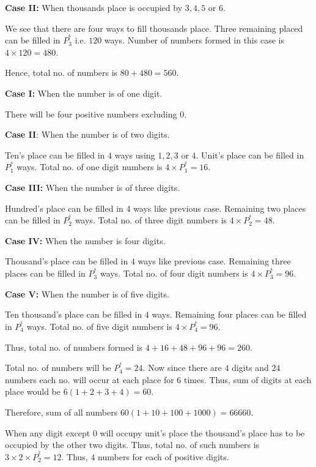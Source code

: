   {\bf Case II:} When thousands place is occupied by $3, 4, 5$ or $6$.

  We see that there are four ways to fill thousands place. Three remaining placed can be filled in $P_3^^6$
  i.e. $120$ ways. Number of numbers formed in this case is $4\times 120 = 480$.

  Hence, total no. of numbers is $80 + 480 = 560$.
\item {\bf Case I:} When the number is of one digit.

  There will be four positive numbers excluding $0$.

  {\bf Case II}: When the number is of two digits.

  Ten's place can be filled in $4$ ways using $1, 2, 3$ or $4$. Unit's place can be filled in $P_1^^4$
  ways. Total no. of one digit numbers is $4\times P_1^^4 = 16$.

  {\bf Case III:} When the number is of three digits.

  Hundred's place can be filled in $4$ ways like previous case. Remaining two places can be filled in
  $P_2^^4$ ways. Total no. of three digit numbers is $4\times P_2^^4 = 48$.

  {\bf Case IV:} When the number is four digits.

  Thousand's place can be filled in $4$ ways like previous case. Remaining three places can be filled in
  $P_3^^4$ ways. Total no. of four digit numbers is $4\times P_3^^4 = 96$.

  {\bf Case V:} When the number is of five digits.

  Ten thousand's place can be filled in $4$ ways. Remaining four places can be filled in $P_4^^4$
  ways. Total no. of five digit numbers is $4\times P_4^^4 = 96$.

  Thus, total no. of numbers formed is $4 + 16 + 48 + 96 + 96 = 260$.
\item Total no. of numbers will be $P_4^^4 = 24$. Now since there are $4$ digits and $24$ numbers each
  no. will occur at each place for $6$ times. Thus, sum of digits at each place would be $6(1 + 2 + 3 + 4) =
  60$.

  Therefore, sum of all numbers $60(1 + 10 + 100 + 1000) = 66660$.
\item When any digit except $0$ will occupy unit's place the thousand's place has to be occupied by the
  other two digits. Thus, total no. of such numbers is $3\times2\times P_2^^2 = 12$. Thus, $4$ numbers for
  each of positive digits.

